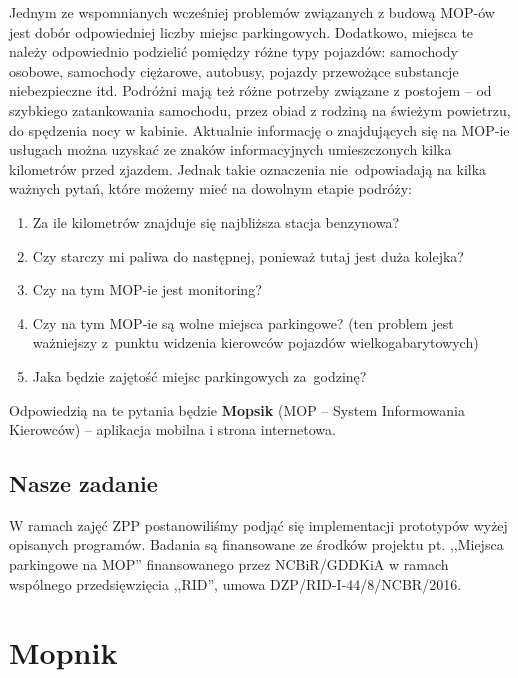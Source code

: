 Jednym ze wspomnianych wcześniej problemów związanych z budową MOP-ów jest dobór odpowiedniej liczby miejsc parkingowych. Dodatkowo, miejsca te należy odpowiednio podzielić pomiędzy różne typy pojazdów: samochody osobowe, samochody ciężarowe, autobusy, pojazdy przewożące substancje niebezpieczne itd. Podróżni mają też różne potrzeby związane z postojem -- od szybkiego zatankowania samochodu, przez obiad z rodziną na świeżym powietrzu, do spędzenia nocy w kabinie. \newline Aktualnie informację o znajdujących się na MOP-ie usługach można uzyskać ze znaków informacyjnych umieszczonych kilka kilometrów przed zjazdem. Jednak takie oznaczenia nie~odpowiadają na kilka ważnych pytań, które możemy mieć na dowolnym etapie podróży:
\begin{enumerate}
	\item Za ile kilometrów znajduje się najbliższa stacja benzynowa? 
	\item Czy starczy mi paliwa do następnej, ponieważ tutaj jest duża kolejka?
	\item Czy na tym MOP-ie jest monitoring?
	\item Czy na tym MOP-ie są wolne miejsca parkingowe? (ten problem jest ważniejszy z~punktu widzenia kierowców pojazdów wielkogabarytowych)
	\item Jaka będzie zajętość miejsc parkingowych za~godzinę?
\end{enumerate}

Odpowiedzią na te pytania będzie \textbf{Mopsik} (MOP -- System Informowania Kierowców) -- aplikacja mobilna i strona internetowa.


\section{Nasze zadanie}
W ramach zajęć ZPP postanowiliśmy podjąć się implementacji prototypów wyżej opisanych programów.
Badania są finansowane ze środków projektu pt. ,,Miejsca parkingowe na MOP'' finansowanego przez NCBiR/GDDKiA w ramach wspólnego przedsięwzięcia ,,RID'', umowa DZP/RID-I-44/8/NCBR/2016.
\chapter{Mopnik}\label{r:Mopnik}

